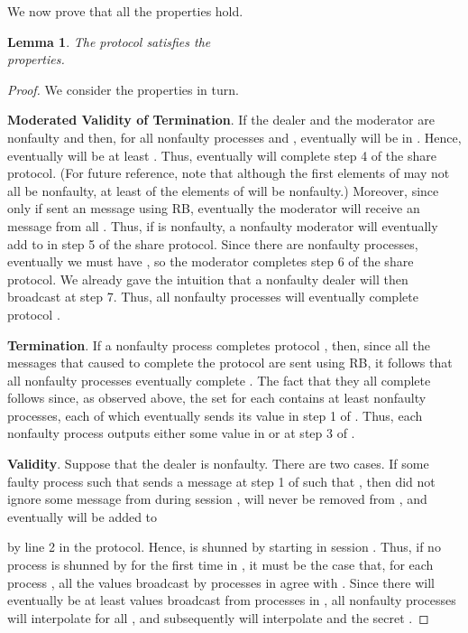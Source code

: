 \documentclass{sig-alternate}
\newtheorem{lemma}{Lemma}
\newcommand{\mwdavss}{\text{MW-SVSS}\xspace}
\begin{document}
We now prove that all the \mwdavss properties hold.
\begin{lemma}\label{lem:mwdavss}
The \mwdavss protocol satisfies the\\ \mwdavss properties.
\end{lemma}
\begin{proof}
We consider the properties in turn.

\textbf{Moderated Validity of Termination}. If the dealer and the
moderator are nonfaulty and  then, for
all nonfaulty processes  and , eventually 
will be in .   Hence, eventually  will be at least
.  Thus, eventually  will complete step 4 of the share protocol.
(For future reference, note that although the first  elements of
 may not all be nonfaulty,
at least  of the elements of  will be nonfaulty.)
Moreover, since  only if  sent an  message
using RB, eventually the moderator will receive an
 message from all .  Thus, if  is
nonfaulty, a nonfaulty moderator will eventually add  to 
in step 5 of the share protocol.
Since there are  nonfaulty processes,
eventually we must have
, so the moderator completes step 6 of the share
protocol.  We already gave the intuition that a nonfaulty dealer will then
broadcast  at step 7.  Thus, all nonfaulty processes
will eventually complete protocol .

\textbf{Termination}. If a nonfaulty process  completes protocol
,
then, since all the messages that caused  to complete the protocol
are sent using RB, it follows that all nonfaulty processes
eventually complete .
The fact that
they all  complete  follows since, as observed above, the
set  for each
 contains at least  nonfaulty
processes, each of which eventually sends its value
in step 1 of .  Thus, each nonfaulty process
outputs either some value in  or  at step 3 of .

\textbf{Validity}.
Suppose that the dealer  is nonfaulty.  There are two cases.   If
some  faulty process  such that  sends
a message  at step 1 of  such that , then 
did not ignore some message from  during session ,  
will never be removed from , and eventually  will be added to

by line 2 in the  protocol.
Hence,  is shunned by  starting in session .
Thus, if no process is shunned by  for the first time in , it
must be the case that, for each process , all the values broadcast by processes in 
agree with .  Since
there will eventually be at least  values broadcast from
processes in , all
nonfaulty processes will interpolate  for all , and subsequently will interpolate  and the secret .


\end{proof}
\end{document}
